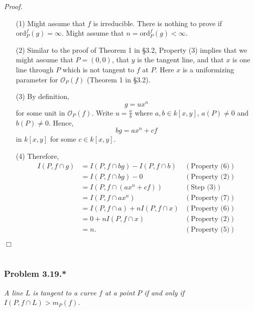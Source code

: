 \documentclass{article}
\begin{document}
\emph{Proof.}
\begin{enumerate}
\item[(1)]
  Might assume that $f$ is irreducible.
  There is nothing to prove if $\mathrm{ord}_P^{f}(g) = \infty$.
  Might assume that $n = \mathrm{ord}_P^{f}(g) < \infty$.

\item[(2)]
  Similar to the proof of Theorem 1 in \S 3.2,
  Property (3) implies that we might assume that $P = (0,0)$,
  that $y$ is the tangent line,
  and that $x$ is one line through $P$ which is not tangent to $f$ at $P$.
  Here $x$ is a uniformizing parameter for $\mathscr{O}_P(f)$ (Theorem 1 in \S 3.2).

\item[(3)]
  By definition,
  \[
    g = ux^n
  \]
  for some unit in $\mathscr{O}_P(f)$.
  Write $u = \frac{a}{b}$ where $a, b \in k[x,y]$, $a(P) \neq 0$ and $b(P) \neq 0$.
  Hence,
  \[
    bg = ax^n + cf
  \]
  in $k[x,y]$ for some $c \in k[x,y]$.

\item[(4)]
  Therefore,
  \begin{align*}
    I(P, f \cap g)
    &= I(P, f \cap bg) - I(P, f \cap b)
      &(\text{Property (6)}) \\
    &= I(P, f \cap bg) - 0
      &(\text{Property (2)}) \\
    &= I(P, f \cap (ax^n + cf))
      &(\text{Step (3)}) \\
    &= I(P, f \cap ax^n)
      &(\text{Property (7)}) \\
    &= I(P, f \cap a) + n I(P, f \cap x)
      &(\text{Property (6)}) \\
    &= 0 + n I(P, f \cap x)
      &(\text{Property (2)}) \\
    &= n.
      &(\text{Property (5)})
  \end{align*}
\end{enumerate}
$\Box$ \\\\






\subsubsection*{Problem 3.19.*}
\emph{A line $L$ is tangent to a curve $f$ at a point $P$ if and only if
$I(P, f \cap L) > m_P(f)$.} \\
\end{document}
